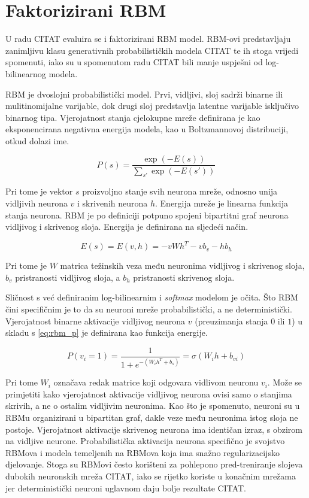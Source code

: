 \documentclass[times, utf8, diplomski, numeric]{fer}
\begin{document}
\chapter{Faktorizirani RBM}

U radu CITAT evaluira se i faktorizirani RBM  model. RBM-ovi predstavljaju zanimljivu klasu generativnih probabilističkih modela CITAT te ih stoga vrijedi spomenuti, iako su u spomenutom radu CITAT bili manje uspješni od log-bilinearnog modela.

RBM je dvoslojni probabilistički model. Prvi, vidljivi, sloj sadrži binarne ili mulitinomijalne varijable, dok drugi sloj predstavlja latentne varijable isključivo binarnog tipa. Vjerojatnost stanja cjelokupne mreže definirana je kao eksponencirana negativna energija modela, kao u Boltzmannovoj distribuciji, otkud dolazi ime.

\begin{equation}
\label{eq:rbm_p}
P(s) = \frac{\exp(-E(s))}{\sum_{s'}\exp(-E(s'))}
\end{equation}

Pri tome je vektor $s$ proizvoljno stanje svih neurona mreže, odnosno unija vidljivih neurona $v$ i skrivenih neurona $h$. Energija mreže je linearna funkcija stanja neurona. RBM je po definiciji potpuno spojeni bipartitni graf neurona vidljivog i skrivenog sloja. Energija je definirana na sljedeći način.

\[
E(s) = E(v, h) = - v W h^T  - v b_v - h b_h
\]

Pri tome je $W$ matrica težinskih veza među neuronima vidljivog i skrivenog sloja, $b_v$ pristranosti vidljivog sloja, a $b_h$ pristranosti skrivenog sloja.

Sličnost s već definiranim log-bilinearnim i \textit{softmax} modelom je očita. Što RBM čini specifičnim je to da su neuroni mreže probabilistički, a ne deterministički. Vjerojatnost binarne aktivacije vidljivog neurona $v$ (preuzimanja stanja $0$ ili $1$) u skladu s \ref{eq:rbm_p} je definirana kao funkcija energije.

\[
 P(v_i = 1) = \frac{1}{ 1 + e^{- ( W_i h^T + b_s)}} = \sigma( W_i h + b_{vi})
\]

Pri tome $W_i$ označava redak matrice koji odgovara vidlivom neuronu $v_i$. Može se primjetiti kako vjerojatnost aktivacije vidljivog neurona ovisi samo o stanjima skrivih, a ne o ostalim vidljivim neuronima. Kao što je spomenuto, neuroni su u RBMu organizirani u bipartitan graf, dakle veze među neuronima istog sloja ne postoje. Vjerojatnost aktivacije skrivenog neurona ima identičan izraz, s obzirom na vidljive neurone. Probabilistička aktivacija neurona specifično je svojstvo RBMova i modela temeljenih na RBMova koja ima snažno regularizacijsko djelovanje. Stoga su RBMovi često korišteni za pohlepono pred-treniranje slojeva dubokih neuronskih mreža CITAT, iako se rijetko koriste u konačnim mrežama jer deterministički neuroni uglavnom daju bolje rezultate CITAT.
\end{document}
